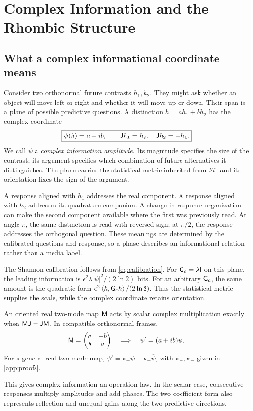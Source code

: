 \section{Complex Information and the Rhombic Structure}
\label{sec:phase}
\subsection{What a complex informational coordinate means}
Consider two orthonormal future contrasts \(h_1,h_2\). They might ask whether an object will move left or right and whether it will move up or down. Their span is a plane of possible predictive questions. A distinction \(h=a h_1+b h_2\) has the complex coordinate
\begin{equation}
\boxed{\psi(h)=a+ib,\qquad
\mathsf J h_1=h_2,\quad\mathsf J h_2=-h_1.}
\label{eq:complex}
\end{equation}
We call \(\psi\) a \emph{complex information amplitude}. Its magnitude specifies the size of the contrast; its argument specifies which combination of future alternatives it distinguishes. The plane carries the statistical metric inherited from \(\mathcal H\), and its orientation fixes the sign of the argument.

A response aligned with \(h_1\) addresses the real component. A response aligned with \(h_2\) addresses its quadrature companion. A change in response organization can make the second component available where the first was previously read. At angle \(\pi\), the same distinction is read with reversed sign; at \(\pi/2\), the response addresses the orthogonal question. These meanings are determined by the calibrated questions and response, so a phase describes an informational relation rather than a media label.

The Shannon calibration follows from \cref{eq:calibration}. For \(\mathsf G_c=\lambda\mathsf I\) on this plane, the leading information is \(\epsilon^2\lambda|\psi|^2/(2\ln2)\) bits. For an arbitrary \(\mathsf G_c\), the same amount is the quadratic form \(\epsilon^2\left\langle h,\mathsf G_ch\right\rangle/(2\ln2)\). Thus the statistical metric supplies the scale, while the complex coordinate retains orientation.

\begin{proposition}
\label{prop:complex}
An oriented real two-mode map \(\mathsf M\) acts by scalar complex multiplication exactly when \(\mathsf M\mathsf J=\mathsf J\mathsf M\). In compatible orthonormal frames,
\begin{equation*}
\mathsf M=\begin{pmatrix}a&-b\\b&a\end{pmatrix}
\quad\Longrightarrow\quad\psi'=(a+ib)\psi.
\end{equation*}
For a general real two-mode map, \(\psi'=\kappa_+\psi+\kappa_-\overline\psi\), with \(\kappa_+,\kappa_-\) given in \cref{app:proofs}.
\end{proposition}
This gives complex information an operation law. In the scalar case, consecutive responses multiply amplitudes and add phases. The two-coefficient form also represents reflection and unequal gains along the two predictive directions.

